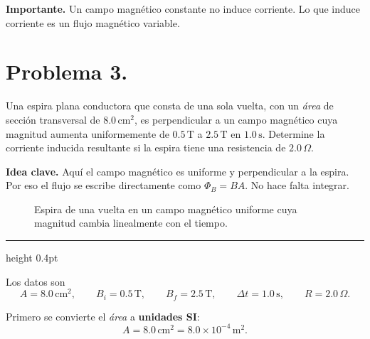 \documentclass[11pt]{article}
\newcommand{\soluciontitulo}{%
  \par\medskip
  \noindent{\large\bfseries Solución.}\par
  \vspace{0.2em}\hrule height 0.4pt \vspace{0.7em}%
}
\newcommand{\ideaclave}[1]{%
  \par\medskip
  \noindent\textbf{Idea clave.} #1\par
}
\newcommand{\importante}[1]{%
  \par\medskip
  \noindent\textbf{Importante.} #1\par
}
\newcommand{\Bentra}[2]{%
    \draw[fieldblue,line width=0.55pt] (#1,#2) circle (0.11);
    \draw[fieldblue,line width=0.55pt] ($(#1,#2)+(-0.065,-0.065)$)--($(#1,#2)+(0.065,0.065)$);
    \draw[fieldblue,line width=0.55pt] ($(#1,#2)+(-0.065,0.065)$)--($(#1,#2)+(0.065,-0.065)$);
}
\begin{document}
\importante{Un campo magn\'etico constante no induce corriente. Lo que induce corriente es un flujo magn\'etico variable.}


\clearpage

\section*{Problema 3.}
Una espira plana conductora que consta de una sola vuelta, con un \textit{\'area} de secci\'on transversal de $8.0\,\mathrm{cm^2}$, es perpendicular a un campo magn\'etico cuya magnitud aumenta uniformemente de $0.5\,\mathrm{T}$ a $2.5\,\mathrm{T}$ en $1.0\,\mathrm{s}$. Determine la corriente inducida resultante si la espira tiene una resistencia de $2.0\,\Omega$.

\ideaclave{Aqu\'i el campo magn\'etico es uniforme y perpendicular a la espira. Por eso el flujo se escribe directamente como $\Phi_B=BA$. No hace falta integrar.}

\begin{figure}[H]
\centering
{}
\caption{Espira de una vuelta en un campo magn\'etico uniforme cuya magnitud cambia linealmente con el tiempo.}
\label{fig:p3_uniforme}
\end{figure}

\soluciontitulo

Los datos son
\begin{equation*}
    A=8.0\,\mathrm{cm^2},\qquad
    B_i=0.5\,\mathrm{T},\qquad
    B_f=2.5\,\mathrm{T},\qquad
    \Delta t=1.0\,\mathrm{s},\qquad
    R=2.0\,\Omega.
\end{equation*}

Primero se convierte el \textit{\'area} a \textbf{unidades SI}:
\begin{equation*}
    A=8.0\,\mathrm{cm^2}=8.0\times10^{-4}\,\mathrm{m^2}.
\end{equation*}
\end{document}

